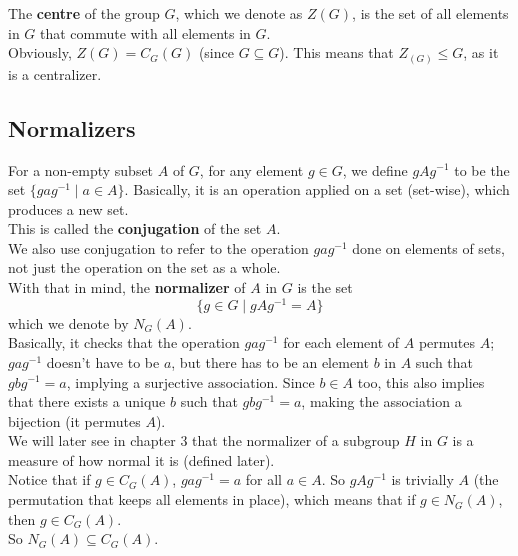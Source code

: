 \documentclass[12pt]{article}
\begin{document}
    The \textbf{centre} of the group $G$,
    which we denote as $Z(G)$,
    is the set of all elements in $G$
    that commute with all elements in $G$. \\
    Obviously, $Z(G) = C_G(G)$
    (since $G \subseteq G$).
    This means that $Z_(G) \leqslant G$,
    as it is a centralizer. \\

    \subsection*{Normalizers}

    For a non-empty subset $A$ of $G$,
    for any element $g \in G$,
    we define $gAg^{-1}$ to be the set $\{ gag^{-1} \mid a \in A \}$.
    Basically, it is an operation applied on a set (set-wise),
    which produces a new set. \\
    This is called the \textbf{conjugation} of the set $A$. \\
    We also use conjugation to refer to
    the operation $gag^{-1}$ done on elements of sets,
    not just the operation on the set as a whole. \\

    With that in mind,
    the \textbf{normalizer} of $A$ in $G$
    is the set
    \[ \{ g \in G \mid gAg^{-1} = A \} \]
    which we denote by $N_G(A)$. \\
    Basically, it checks that the operation $gag^{-1}$
    for each element of $A$
    permutes $A$;
    $gag^{-1}$ doesn't have to be $a$,
    but there has to be an element $b$ in $A$ such that $gbg^{-1} = a$,
    implying a surjective association.
    Since $b \in A$ too, this also implies that
    there exists a unique $b$ such that $gbg^{-1} = a$,
    making the association a bijection (it permutes $A$). \\
    
    We will later see in chapter 3
    that the normalizer of a subgroup $H$
    in $G$ is a measure of how normal it is
    (defined later). \\

    Notice that if $g \in C_G(A)$,
    $gag^{-1} = a$ for all $a \in A$.
    So $gAg^{-1}$ is trivially $A$
    (the permutation that keeps all elements in place),
    which means that if $g \in N_G(A)$, then $g \in C_G(A)$. \\
    So $N_G(A) \subseteq C_G(A)$. \\
\end{document}
